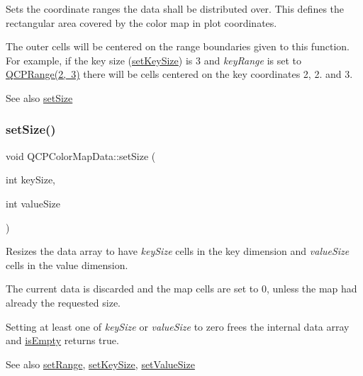 Sets the coordinate ranges the data shall be distributed over. This defines the rectangular area covered by the color map in plot coordinates.

The outer cells will be centered on the range boundaries given to this function. For example, if the key size (\mbox{\hyperlink{class_q_c_p_color_map_data_ac7ef70e383aface34b44dbde49234b6b}{set\+Key\+Size}}) is 3 and {\itshape key\+Range} is set to {\ttfamily \mbox{\hyperlink{class_q_c_p_range}{Q\+C\+P\+Range(2, 3)}}} there will be cells centered on the key coordinates 2, 2. and 3.

\begin{DoxySeeAlso}{See also}
\mbox{\hyperlink{class_q_c_p_color_map_data_a0d9ff35c299d0478b682bfbcdd9c097e}{set\+Size}} 
\end{DoxySeeAlso}
\mbox{\label{class_q_c_p_color_map_data_a0d9ff35c299d0478b682bfbcdd9c097e}} 
\subsubsection{\texorpdfstring{setSize()}{setSize()}}
{\footnotesize\ttfamily void Q\+C\+P\+Color\+Map\+Data\+::set\+Size (\begin{DoxyParamCaption}\item[{int}]{key\+Size,  }\item[{int}]{value\+Size }\end{DoxyParamCaption})}

Resizes the data array to have {\itshape key\+Size} cells in the key dimension and {\itshape value\+Size} cells in the value dimension.

The current data is discarded and the map cells are set to 0, unless the map had already the requested size.

Setting at least one of {\itshape key\+Size} or {\itshape value\+Size} to zero frees the internal data array and \mbox{\hyperlink{class_q_c_p_color_map_data_aea88cc75a76ca571acf29b2ba8ac970d}{is\+Empty}} returns true.

\begin{DoxySeeAlso}{See also}
\mbox{\hyperlink{class_q_c_p_color_map_data_aad9c1c7c703c1339489fc730517c83d4}{set\+Range}}, \mbox{\hyperlink{class_q_c_p_color_map_data_ac7ef70e383aface34b44dbde49234b6b}{set\+Key\+Size}}, \mbox{\hyperlink{class_q_c_p_color_map_data_a0893c9e3914513048b45e3429ffd16f2}{set\+Value\+Size}} 
\end{DoxySeeAlso}
\mbox{\label{class_q_c_p_color_map_data_ada1b2680ba96a5f4175b6d341cf75d23}} 
